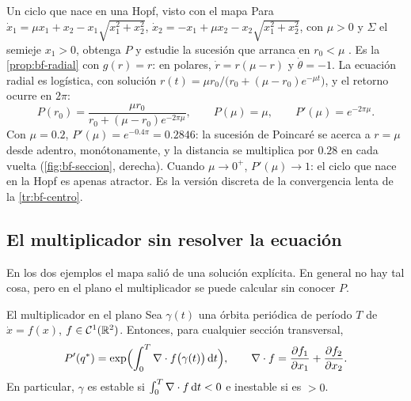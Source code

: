 \begin{ejemplo}[label=ej:bf-mapa2]{Un ciclo que nace en una Hopf, visto con el mapa}
Para $\dot x_1=\mu x_1+x_2-x_1\sqrt{x_1^2+x_2^2}$, $\dot x_2=-x_1+\mu x_2-x_2\sqrt{x_1^2+x_2^2}$, con $\mu>0$ y $\Sigma$ el semieje $x_1>0$, obtenga $P$ y estudie la sucesión que arranca en $r_0<\mu$ \citep[\S13.2]{JoSm07}.
\solucion Es la \cref{prop:bf-radial} con $g(r)=r$: en polares, $\dot r=r(\mu-r)$ y $\dot\theta=-1$. La ecuación radial es logística, con solución $r(t)=\mu r_0/\bigl(r_0+(\mu-r_0)e^{-\mu t}\bigr)$, y el retorno ocurre en $2\pi$:
\[
  P(r_0)=\frac{\mu r_0}{r_0+(\mu-r_0)e^{-2\pi\mu}} ,\qquad P(\mu)=\mu,\qquad P'(\mu)=e^{-2\pi\mu} .
\]
Con $\mu=0.2$, $P'(\mu)=e^{-0.4\pi}=0.2846$: la sucesión de Poincaré se acerca a $r=\mu$ desde adentro, monótonamente, y la distancia se multiplica por $0.28$ en cada vuelta (\cref{fig:bf-seccion}, derecha). Cuando $\mu\to0^+$, $P'(\mu)\to1$: el ciclo que nace en la Hopf es apenas atractor. Es la versión discreta de la convergencia lenta de la \cref{tr:bf-centro}.
\end{ejemplo}


\subsection{El multiplicador sin resolver la ecuación}

En los dos ejemplos el mapa salió de una solución explícita. En general no hay tal cosa, pero en el plano el multiplicador se puede calcular sin conocer $P$.

\begin{teorema}[label=thm:bf-divergencia]{El multiplicador en el plano \citep[\S3.4, Teorema~2]{Per01}}
Sea $\gamma(t)$ una órbita periódica de período $T$ de $\dot x=f(x)$, $f\in\mathcal{C}^{1}(\mathbb{R}^2)$. Entonces, para cualquier sección transversal,
\[
  P'(q^*)=\exp\Bigl(\int_0^T\nabla\cdot f\bigl(\gamma(t)\bigr)\,\mathrm{d} t\Bigr),\qquad \nabla\cdot f=\frac{\partial f_1}{\partial x_1}+\frac{\partial f_2}{\partial x_2} .
\]
En particular, $\gamma$ es estable si $\int_0^T\nabla\cdot f\,\mathrm{d} t<0$ e inestable si es $>0$.
\end{teorema}


